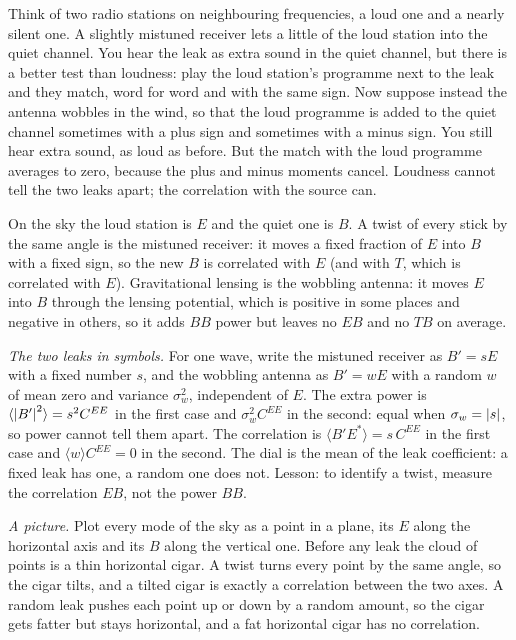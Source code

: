 Think of two radio stations on neighbouring frequencies, a loud one and a nearly silent one. A slightly mistuned receiver lets a little of the loud station into the quiet channel. You hear the leak as extra sound in the quiet channel, but there is a better test than loudness: play the loud station's programme next to the leak and they match, word for word and with the same sign. Now suppose instead the antenna wobbles in the wind, so that the loud programme is added to the quiet channel sometimes with a plus sign and sometimes with a minus sign. You still hear extra sound, as loud as before. But the match with the loud programme averages to zero, because the plus and minus moments cancel. Loudness cannot tell the two leaks apart; the correlation with the source can.

On the sky the loud station is $E$ and the quiet one is $B$. A twist of every stick by the same angle is the mistuned receiver: it moves a fixed fraction of $E$ into $B$ with a fixed sign, so the new $B$ is correlated with $E$ (and with $T$, which is correlated with $E$). Gravitational lensing is the wobbling antenna: it moves $E$ into $B$ through the lensing potential, which is positive in some places and negative in others, so it adds $BB$ power but leaves no $EB$ and no $TB$ on average.

\emph{The two leaks in symbols.} For one wave, write the mistuned receiver as $B'=sE$ with a fixed number $s$, and the wobbling antenna as $B'=wE$ with a random $w$ of mean zero and variance $\sigma_w^2$, independent of $E$. The extra power is $\langle\left\lvert B'\right\rvert^2\rangle=s^2C^{EE}$ in the first case and $\sigma_w^2C^{EE}$ in the second: equal when $\sigma_w=\left\lvert s\right\rvert$, so power cannot tell them apart. The correlation is $\langle B'E^*\rangle=s\,C^{EE}$ in the first case and $\langle w\rangle C^{EE}=0$ in the second. The dial is the mean of the leak coefficient: a fixed leak has one, a random one does not. Lesson: to identify a twist, measure the correlation $EB$, not the power $BB$.

\emph{A picture.} Plot every mode of the sky as a point in a plane, its $E$ along the horizontal axis and its $B$ along the vertical one. Before any leak the cloud of points is a thin horizontal cigar. A twist turns every point by the same angle, so the cigar tilts, and a tilted cigar is exactly a correlation between the two axes. A random leak pushes each point up or down by a random amount, so the cigar gets fatter but stays horizontal, and a fat horizontal cigar has no correlation.

